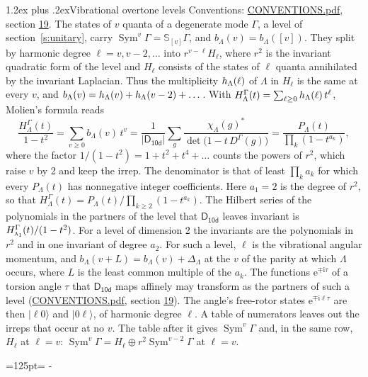 \documentclass[10pt,a4paper]{article}
\makeatletter
\renewcommand\section{\@startsection{section}{1}{\z@}{-3ex plus -1ex minus -.2ex}%
  {1.2ex plus .2ex}{\normalfont\large\sffamily\bfseries\color{parttitle}}}
\newcommand{\needspace}[1]{\par\penalty-100\begingroup\dimen0=#1\relax\dimen2=\pagegoal
  \advance\dimen2-\pagetotal\ifdim\dimen0>\dimen2\relax\ifdim\dimen2>0pt\vfil\break\fi\fi
  \endgroup}
\numberwithin{equation}{section}
\newcommand{\grp}[1]{\mathsf{#1}}
\newcommand{\irr}[1]{\text{\normalfont\scshape #1}}
\newcommand{\iunit}{\mathrm{i}}
\newcommand{\expe}{\mathrm{e}}
\newcommand{\repD}[1]{D^{#1}}
\newcommand{\irchar}[1]{\chi_{#1}}
\newcommand{\conj}[1]{{#1}^{*}}
\newcommand{\schur}[1]{\mathbb{S}_{#1}}
\newcommand{\shape}[1]{[#1]}
\newcommand{\occ}[1]{\lvert #1\rangle}
\makeatother
\begin{document}
\section{Vibrational overtone levels}\label{s:overtones}
Conventions: \href{../../CONVENTIONS.pdf}{CONVENTIONS.pdf}, section \href{../../CONVENTIONS.pdf\#conv.19}{19}.
\leavevmode\label{n:index.quanta}\label{n:operator.symmetric.power}The states of $v$ quanta of a degenerate mode $\Gamma$, a level of section~\ref{s:unitary}, carry $\operatorname{Sym}^{v}\Gamma = \schur{\shape{v}}\Gamma$, and $b_\Lambda(v) = b_\Lambda(\shape{v})$. \label{n:local.quadratic.form}\label{n:set.harmonic}They split by harmonic degree $\ell = v, v - 2, \dots$ into $r^{v-\ell}H_\ell$, where $r^2$ is the invariant quadratic form of the level and $H_\ell$ consists of the states of $\ell$ quanta annihilated by the invariant Laplacian. \label{n:function.multiplicity.harmonic}Thus the multiplicity $\mathnormal{h}_\Lambda(\ell)$ of $\Lambda$ in $H_\ell$ is the same at every $v$, and $b_\Lambda(v) = \mathnormal{h}_\Lambda(v) + \mathnormal{h}_\Lambda(v - 2) + \dots$. \label{n:function.generating.level}With $H^{\Gamma}_\Lambda(t) = \sum_{\ell\ge0} \mathnormal{h}_\Lambda(\ell)\,t^{\ell}$, Molien's formula reads
\begin{equation}\label{e:molien}\frac{H^{\Gamma}_\Lambda(t)}{1 - t^2} = \sum_{v\ge0} b_\Lambda(v)\,t^v = \frac{1}{|\grp{D_{10d}}|}\sum_{g}\frac{\conj{\irchar{\Lambda}(g)}}{\det\bigl(1 - t\,\repD{\Gamma}(g)\bigr)} = \frac{P_\Lambda(t)}{\prod_k (1-t^{a_k})},\end{equation}
where the factor $1/(1 - t^2) = 1 + t^2 + t^4 + \dots$ counts the powers of $r^2$, which raise $v$ by 2 and keep the irrep. The denominator is that of least $\prod_k a_k$ for which every $P_\Lambda(t)$ has nonnegative integer coefficients. Here $a_1 = 2$ is the degree of $r^2$, so that $H^{\Gamma}_\Lambda(t) = P_\Lambda(t)/\prod_{k\ge2}(1 - t^{a_k})$. The Hilbert series of the polynomials in the partners of the level that $\grp{D_{10d}}$ leaves invariant is $H^{\Gamma}_{\irr{a}_{1}}(t)/(1 - t^2)$. For a level of dimension 2 the invariants are the polynomials in $r^2$ and in one invariant of degree $a_2$. \label{n:index.overtone.period}\label{n:index.increment.unitary}For such a level, $\ell$ is the vibrational angular momentum, and $b_\Lambda(v + L) = b_\Lambda(v) + \Delta_\Lambda$ at the $v$ of the parity at which $\Lambda$ occurs, where $L$ is the least common multiple of the $a_k$. \label{n:local.torsion.angle}The functions $\expe^{\mp\iunit\tau}$ of a torsion angle $\tau$ that $\grp{D_{10d}}$ maps affinely may transform as the partners of such a level (\href{../../CONVENTIONS.pdf}{CONVENTIONS.pdf}, section \href{../../CONVENTIONS.pdf\#conv.19}{19}). The angle's free-rotor states $\expe^{\mp\iunit\ell\tau}$ are then $\occ{\ell 0}$ and $\occ{0 \ell}$, of harmonic degree $\ell$. A table of numerators leaves out the irreps that occur at no $v$. The table after it gives $\operatorname{Sym}^{v}\Gamma$ and, in the same row, $H_\ell$ at $\ell = v$: $\operatorname{Sym}^{v}\Gamma = H_\ell \oplus r^2\operatorname{Sym}^{v-2}\Gamma$ at $\ell = v$.
\needspace{125pt}
\end{document}
